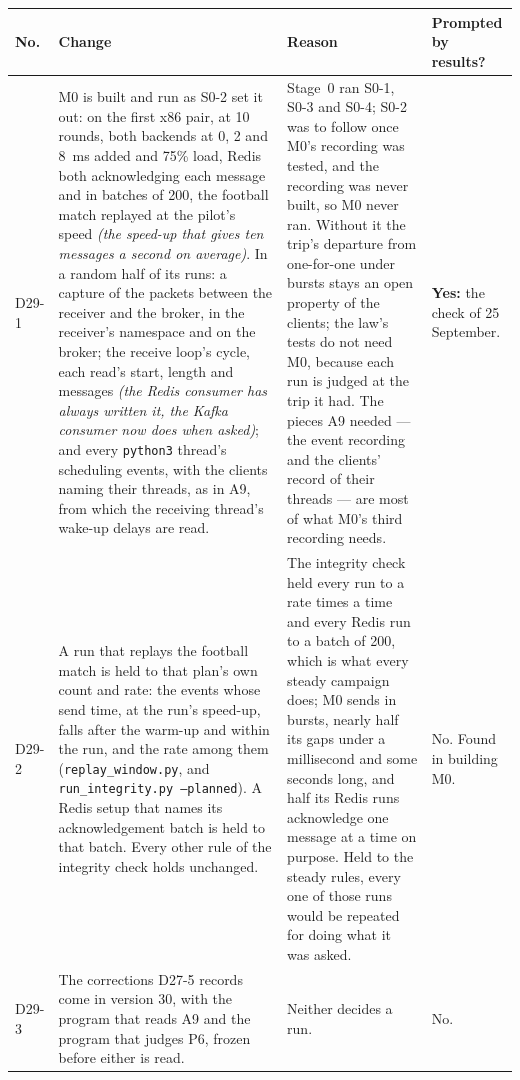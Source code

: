 \documentclass[11pt]{article}
\newcommand{\gl}[1]{{\color{soft}\itshape\small (#1)}}
\begin{document}
{\small
\begin{longtable}{@{}p{1.1cm} >{\raggedright\arraybackslash}p{6.1cm} >{\raggedright\arraybackslash}p{6.0cm} >{\raggedright\arraybackslash}p{2.2cm}@{}}
\toprule
\textbf{No.} & \textbf{Change} & \textbf{Reason} & \textbf{Prompted by results?} \\
\midrule
\endhead
D29-1 & M0 is built and run as S0-2 set it out: on the first x86 pair, at 10 rounds, both backends at 0, 2 and 8~ms added and 75\% load, Redis both acknowledging each message and in batches of 200, the football match replayed at the pilot's speed \gl{the speed-up that gives ten messages a second on average}. In a random half of its runs: a capture of the packets between the receiver and the broker, in the receiver's namespace and on the broker; the receive loop's cycle, each read's start, length and messages \gl{the Redis consumer has always written it, the Kafka consumer now does when asked}; and every \texttt{python3} thread's scheduling events, with the clients naming their threads, as in A9, from which the receiving thread's wake-up delays are read. & Stage~0 ran S0-1, S0-3 and S0-4; S0-2 was to follow once M0's recording was tested, and the recording was never built, so M0 never ran. Without it the trip's departure from one-for-one under bursts stays an open property of the clients; the law's tests do not need M0, because each run is judged at the trip it had. The pieces A9 needed --- the event recording and the clients' record of their threads --- are most of what M0's third recording needs. & \textbf{Yes:} the check of 25 September. \\
D29-2 & A run that replays the football match is held to that plan's own count and rate: the events whose send time, at the run's speed-up, falls after the warm-up and within the run, and the rate among them (\texttt{replay\_window.py}, and \texttt{run\_integrity.py --planned}). A Redis setup that names its acknowledgement batch is held to that batch. Every other rule of the integrity check holds unchanged. & The integrity check held every run to a rate times a time and every Redis run to a batch of 200, which is what every steady campaign does; M0 sends in bursts, nearly half its gaps under a millisecond and some seconds long, and half its Redis runs acknowledge one message at a time on purpose. Held to the steady rules, every one of those runs would be repeated for doing what it was asked. & No. Found in building M0. \\
D29-3 & The corrections D27-5 records come in version 30, with the program that reads A9 and the program that judges P6, frozen before either is read. & Neither decides a run. & No. \\
\bottomrule
\end{longtable}}
\end{document}
